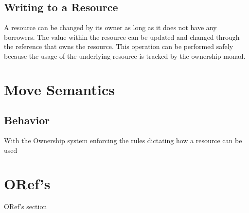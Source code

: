 \documentclass[onehalf,11pt]{beavtex}
\begin{document}

\subsection{Writing to a Resource}

A resource can be changed by its owner as long as it does not have any borrowers.
The value within the resource can be updated and changed through the reference
that owns the resource. This operation can be performed safely because the usage
of the underlying resource is tracked by the ownership monad.



\section{Move Semantics}

\subsection{Behavior}

With the Ownership system enforcing the rules dictating how a resource can be
used

\section{ORef's}
ORef's section




{}

\end{document}

